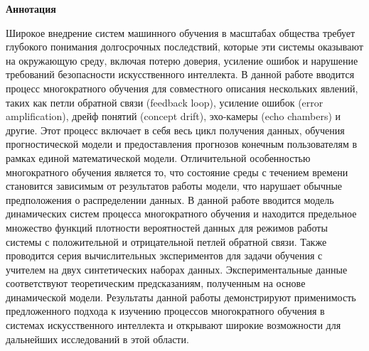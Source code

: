 \begin{center}
    \Large{\textbf{Аннотация}}
\end{center}

Широкое внедрение систем машинного обучения в масштабах общества требует глубокого понимания долгосрочных последствий, которые эти системы оказывают на окружающую среду, включая потерю доверия, усиление ошибок и нарушение требований безопасности искусственного интеллекта.
В данной работе вводится процесс многократного обучения для совместного описания нескольких явлений, таких как петли обратной связи (feedback loop), усиление ошибок (error amplification), дрейф понятий (concept drift), эхо-камеры (echo chambers) и другие. Этот процесс включает в себя весь цикл получения данных, обучения прогностической модели и предоставления прогнозов конечным пользователям в рамках единой математической модели.
Отличительной особенностью многократного обучения является то, что состояние среды с течением времени становится зависимым от результатов работы модели, что нарушает обычные предположения о распределении данных.
В данной работе вводится модель динамических систем процесса многократного обучения и находится предельное множество функций плотности вероятностей данных для режимов работы системы с положительной и отрицательной петлей обратной связи.
Также проводится серия вычислительных экспериментов для задачи обучения с учителем на двух синтетических наборах данных. Экспериментальные данные соответствуют теоретическим предсказаниям, полученным на основе динамической модели. Результаты данной работы демонстрируют применимость предложенного подхода к изучению процессов многократного обучения в системах искусственного интеллекта и открывают широкие возможности для дальнейших исследований в этой области.